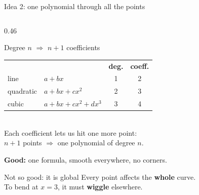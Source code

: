\documentclass[aspectratio=169]{beamer}
\begin{document}
\begin{frame}{Idea 2: one polynomial through all the points}
\begin{columns}[c]
\begin{column}{0.46\textwidth}
\small
\begin{block}{Degree $n$ $\Rightarrow$ $n+1$ coefficients}
\footnotesize
\setlength{\tabcolsep}{3pt}
\begin{tabular}{llcc}
 & & \textbf{deg.} & \textbf{coeff.} \\
line & $a + bx$ & 1 & 2 \\
quadratic & $a + bx + cx^2$ & 2 & 3 \\
cubic & $a + bx + cx^2 + dx^3$ & 3 & 4 \\
\end{tabular}\\[3pt]
Each coefficient lets us hit one more point:\\
$n+1$ points $\Rightarrow$ one polynomial of degree $n$.
\end{block}
\footnotesize \textbf{Good:} one formula, smooth everywhere, no corners.
\begin{alertblock}{Not so good: it is global}
\footnotesize
Every point affects the \textbf{whole} curve.\\
To bend at $x = 3$, it must \textbf{wiggle} elsewhere.
\end{alertblock}


\end{column}
\end{columns}
\end{frame}
\end{document}

